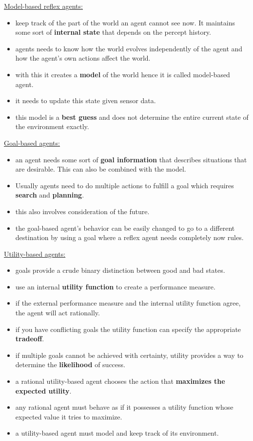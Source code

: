 \underline{Model-based reflex agents:}
\begin{itemize}[noitemsep,nolistsep]
	\item keep track of the part of the world an agent cannot see now. It maintains some sort of \textbf{internal state} that depends on the percept history.
	\item agents needs to know how the world evolves independently of the agent and how the agent’s own actions affect the world.
	\item with this it creates a \textbf{model} of the world hence it is called model-based agent.
	\item it needs to update this state given sensor data.
	\item this model is a \textbf{best guess} and does not determine the entire current state of the environment exactly.
\end{itemize}

\underline{Goal-based agents:}
\begin{itemize}[noitemsep,nolistsep]
	\item an agent needs some sort of \textbf{goal information} that describes situations that are desirable. This can also be combined with the model.
	\item Usually agents need to do multiple actions to fulfill a goal which requires \textbf{search} and \textbf{planning}.
	\item this also involves consideration of the future.
	\item the goal-based agent’s behavior can be easily changed to go to a different destination by using a goal where a reflex agent needs completely now rules.
\end{itemize}

\underline{Utility-based agents:}
\begin{itemize}[noitemsep,nolistsep]
	\item goals provide a crude binary distinction between good and bad states.
	\item use an internal \textbf{utility function} to create a performance measure.
	\item if the external performance measure and the internal utility function agree, the agent will act rationally.
	\item if you have conflicting goals the utility function can specify the appropriate \textbf{tradeoff}.
	\item if multiple goals cannot be achieved with certainty, utility provides a way to determine the \textbf{likelihood} of success.
	\item a rational utility-based agent chooses the action that \textbf{maximizes the expected utility}.
	\item any rational agent must behave as if it possesses a utility function whose expected value it tries to maximize.
	\item a utility-based agent must model and keep track of its environment.
\end{itemize}


